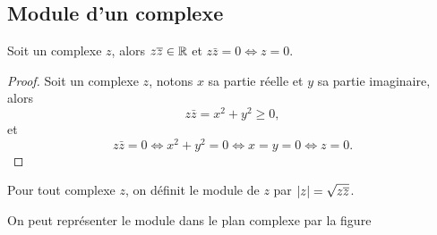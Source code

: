 \subsection{Module d'un complexe}
\label{subsec:modulecomplexe}
\begin{prop}
    Soit un complexe \(z\), alors \(z \overline{z} \in \mathbb{R}\) et \(z \bar{z}=0 \iff z = 
    0\).
\end{prop}
\begin{proof}
    Soit un complexe \(z\), notons \(x\) sa partie réelle et \(y\) sa partie 
    imaginaire, alors
    \begin{equation}
        z \bar{z}=x^2+y^2 \geqslant 0,
    \end{equation}
    et
    \begin{equation}
        z \bar{z}=0 \iff x^2+y^2=0 \iff x=y=0 \iff z=0.
    \end{equation}
\end{proof}
\begin{defdef}
    Pour tout complexe \(z\), on définit le module de \(z\) par 
    \(\left\lvert z\right\rvert=\sqrt{z \overline{z}}\).
\end{defdef}
On peut représenter le module dans le plan complexe par la figure 

